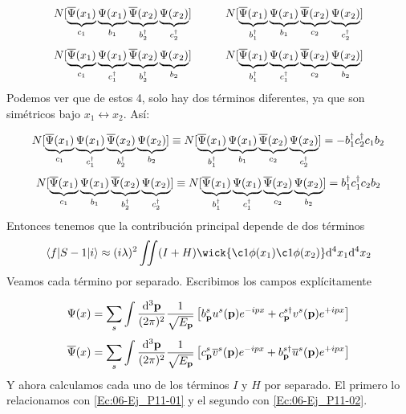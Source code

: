 \begin{solucion}
	\begin{equation*}
		N[\underbrace{ \overline{\Psi} (x_1)}_{c_1}  \underbrace{ \Psi (x_1)}_{b_1}\underbrace{ \overline{\Psi} (x_2)}_{b^\dagger_2} \underbrace{ \Psi (x_2)}_{c^\dagger_2} ] \quad \quad \quad
		N[ \underbrace{ \overline{\Psi} (x_1)}_{b^\dagger_1}\underbrace{ \Psi (x_1)}_{b_1} \underbrace{ \overline{\Psi} (x_2)}_{c_2} \underbrace{ \Psi (x_2)}_{c^\dagger_2} ]
	\end{equation*}
	\begin{equation*}
		N[{ \underbrace{ \overline{\Psi} (x_1)}_{c_1}\underbrace{ \Psi (x_1)}_{c^\dagger_1}  \underbrace{ \overline{\Psi} 	(x_2)}_{b^\dagger_2} \underbrace{ \Psi (x_2)}_{b_2}}] \quad \quad \quad
		N[{\underbrace{ \overline{\Psi} (x_1)}_{b^\dagger_1}\underbrace{ \Psi (x_1)}_{c^\dagger_1}  \underbrace{ \overline{\Psi} 	(x_2)}_{c_2} \underbrace{ \Psi (x_2)}_{b_2} }]
	\end{equation*}
	Podemos ver que de estos 4, solo hay dos términos diferentes, ya que son simétricos bajo $x_1 \leftrightarrow x_2 $. Así:
	
	\begin{equation}
		N[ \underbrace{ \overline{\Psi} (x_1)}_{c_1}\underbrace{ \Psi (x_1)}_{c^\dagger_1}  \underbrace{ \overline{\Psi} 	(x_2)}_{b^\dagger_2} \underbrace{ \Psi (x_2)}_{b_2}] \equiv
		N[\underbrace{ \overline{\Psi} (x_1)}_{b^\dagger_1}\underbrace{ \Psi (x_1)}_{b_1} \underbrace{ \overline{\Psi} 	(x_2)}_{c_2} \underbrace{ \Psi (x_2)}_{c^\dagger_2} ] = - b_1^\dagger c_2^\dagger c_1 b_2 \label{Ec:06-Ej_P11-01}
	\end{equation}
	\begin{equation}
		N[\underbrace{ \overline{\Psi} (x_1)}_{c_1}  \underbrace{ \Psi (x_1)}_{b_1}\underbrace{ \overline{\Psi} 	(x_2)}_{b^\dagger_2} \underbrace{ \Psi (x_2)}_{c^\dagger_2}]\equiv
		N[\underbrace{ \overline{\Psi} (x_1)}_{b^\dagger_1}\underbrace{ \Psi (x_1)}_{c^\dagger_1}  \underbrace{ \overline{\Psi} 	(x_2)}_{c_2} \underbrace{ \Psi (x_2)}_{b_2}] = b_1^\dagger c_1^\dagger c_2 b_2 \label{Ec:06-Ej_P11-02}
	\end{equation}
	Entonces tenemos que la contribución principal depende de dos términos
	\begin{equation*}
		\mel**{f}{S-1}{i}  \approx (i\lambda)^2 \iint ( I + H ) \wick{\c1{\phi}(x_1)\c1{\phi} (x_2)} \D^4 x_1 \D^4 x_2
	\end{equation*}
	Veamos cada término por separado. Escribimos los campos explícitamente
	
	\begin{equation}
		\Psi (x) = \sum_s \int \frac{\mathrm{d}^3\mathbf{p}}{(2\pi)^2} \frac{1}{\sqrt{E_{\mathbf{p}}}} \left[ b_{\mathbf{p}}^s u^s (\mathbf{p}) e^{-ipx}+c^{s \dagger}_{\mathbf{p}} v^s (\mathbf{p}) e^{+ipx} \right]
	\end{equation}                
	\begin{equation}
		\overline{\Psi} (x) = \sum_s \int \frac{\mathrm{d}^3\mathbf{p}}{(2\pi)^2} \frac{1}{\sqrt{E_{\mathbf{p}}}} \left[ c_{\mathbf{p}}^s \overline{v}^s (\mathbf{p}) e^{-ipx}+b^{s \dagger}_{\mathbf{p}} \overline{u}^s (\mathbf{p}) e^{+ipx} \right]
	\end{equation}              
	Y ahora calculamos cada uno de los términos $I$ y $H$ por separado. El primero lo relacionamos con \ref{Ec:06-Ej_P11-01} y el segundo con \ref{Ec:06-Ej_P11-02}.
	

\end{solucion}
